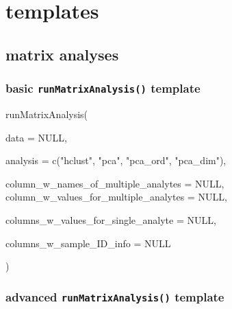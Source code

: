 \documentclass[
]{krantz}
\newenvironment{Shaded}{\begin{snugshade}}{\end{snugshade}}
\newcommand{\AttributeTok}[1]{\textcolor[rgb]{0.77,0.63,0.00}{#1}}
\newcommand{\ConstantTok}[1]{\textcolor[rgb]{0.00,0.00,0.00}{#1}}
\newcommand{\FunctionTok}[1]{\textcolor[rgb]{0.00,0.00,0.00}{#1}}
\newcommand{\NormalTok}[1]{#1}
\newcommand{\StringTok}[1]{\textcolor[rgb]{0.31,0.60,0.02}{#1}}
\begin{document}
\hypertarget{templates}{%
\section{templates}\label{templates}}

\hypertarget{matrix-analyses}{%
\subsection{matrix analyses}\label{matrix-analyses}}

\hypertarget{basic-runmatrixanalysis-template}{%
\subsubsection{\texorpdfstring{basic \texttt{runMatrixAnalysis()} template}{basic runMatrixAnalysis() template}}\label{basic-runmatrixanalysis-template}}

\begin{Shaded}
\begin{Highlighting}[]

\FunctionTok{runMatrixAnalysis}\NormalTok{(}
                
  \AttributeTok{data =} \ConstantTok{NULL}\NormalTok{,}

  \AttributeTok{analysis =} \FunctionTok{c}\NormalTok{(}\StringTok{"hclust"}\NormalTok{, }\StringTok{"pca"}\NormalTok{, }\StringTok{"pca\_ord"}\NormalTok{, }\StringTok{"pca\_dim"}\NormalTok{),}

  \AttributeTok{column\_w\_names\_of\_multiple\_analytes =} \ConstantTok{NULL}\NormalTok{,}
  \AttributeTok{column\_w\_values\_for\_multiple\_analytes =} \ConstantTok{NULL}\NormalTok{,}
    
  \AttributeTok{columns\_w\_values\_for\_single\_analyte =} \ConstantTok{NULL}\NormalTok{,}

  \AttributeTok{columns\_w\_sample\_ID\_info =} \ConstantTok{NULL}

\NormalTok{)}
\end{Highlighting}
\end{Shaded}

\hypertarget{advanced-runmatrixanalysis-template}{%
\subsubsection{\texorpdfstring{advanced \texttt{runMatrixAnalysis()} template}{advanced runMatrixAnalysis() template}}\label{advanced-runmatrixanalysis-template}}
\end{document}
